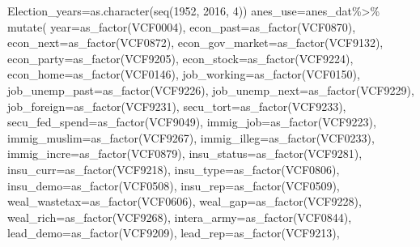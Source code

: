 \documentclass[
]{article}
\newenvironment{Shaded}{\begin{snugshade}}{\end{snugshade}}
\newcommand{\AttributeTok}[1]{\textcolor[rgb]{0.77,0.63,0.00}{#1}}
\newcommand{\DecValTok}[1]{\textcolor[rgb]{0.00,0.00,0.81}{#1}}
\newcommand{\FunctionTok}[1]{\textcolor[rgb]{0.00,0.00,0.00}{#1}}
\newcommand{\NormalTok}[1]{#1}
\newcommand{\OtherTok}[1]{\textcolor[rgb]{0.56,0.35,0.01}{#1}}
\newcommand{\SpecialCharTok}[1]{\textcolor[rgb]{0.00,0.00,0.00}{#1}}
\begin{document}
\begin{Shaded}
\begin{Highlighting}[]
\NormalTok{Election\_years}\OtherTok{=}\FunctionTok{as.character}\NormalTok{(}\FunctionTok{seq}\NormalTok{(}\DecValTok{1952}\NormalTok{, }\DecValTok{2016}\NormalTok{, }\DecValTok{4}\NormalTok{))}
\NormalTok{anes\_use}\OtherTok{=}\NormalTok{anes\_dat}\SpecialCharTok{\%\textgreater{}\%}
  \FunctionTok{mutate}\NormalTok{(}
    \AttributeTok{year=}\FunctionTok{as\_factor}\NormalTok{(VCF0004),}
    \AttributeTok{econ\_past=}\FunctionTok{as\_factor}\NormalTok{(VCF0870),}
    \AttributeTok{econ\_next=}\FunctionTok{as\_factor}\NormalTok{(VCF0872),}
    \AttributeTok{econ\_gov\_market=}\FunctionTok{as\_factor}\NormalTok{(VCF9132),}
    \AttributeTok{econ\_party=}\FunctionTok{as\_factor}\NormalTok{(VCF9205),}
    \AttributeTok{econ\_stock=}\FunctionTok{as\_factor}\NormalTok{(VCF9224),}
    \AttributeTok{econ\_home=}\FunctionTok{as\_factor}\NormalTok{(VCF0146),}
    \AttributeTok{job\_working=}\FunctionTok{as\_factor}\NormalTok{(VCF0150),}
    \AttributeTok{job\_unemp\_past=}\FunctionTok{as\_factor}\NormalTok{(VCF9226),}
    \AttributeTok{job\_unemp\_next=}\FunctionTok{as\_factor}\NormalTok{(VCF9229),}
    \AttributeTok{job\_foreign=}\FunctionTok{as\_factor}\NormalTok{(VCF9231),}
    \AttributeTok{secu\_tort=}\FunctionTok{as\_factor}\NormalTok{(VCF9233),}
    \AttributeTok{secu\_fed\_spend=}\FunctionTok{as\_factor}\NormalTok{(VCF9049),}
    \AttributeTok{immig\_job=}\FunctionTok{as\_factor}\NormalTok{(VCF9223),}
    \AttributeTok{immig\_muslim=}\FunctionTok{as\_factor}\NormalTok{(VCF9267),}
    \AttributeTok{immig\_illeg=}\FunctionTok{as\_factor}\NormalTok{(VCF0233),}
    \AttributeTok{immig\_incre=}\FunctionTok{as\_factor}\NormalTok{(VCF0879),}
    \AttributeTok{insu\_status=}\FunctionTok{as\_factor}\NormalTok{(VCF9281),}
    \AttributeTok{insu\_curr=}\FunctionTok{as\_factor}\NormalTok{(VCF9218),}
    \AttributeTok{insu\_type=}\FunctionTok{as\_factor}\NormalTok{(VCF0806),}
    \AttributeTok{insu\_demo=}\FunctionTok{as\_factor}\NormalTok{(VCF0508),}
    \AttributeTok{insu\_rep=}\FunctionTok{as\_factor}\NormalTok{(VCF0509),}
    \AttributeTok{weal\_wastetax=}\FunctionTok{as\_factor}\NormalTok{(VCF0606),}
    \AttributeTok{weal\_gap=}\FunctionTok{as\_factor}\NormalTok{(VCF9228),}
    \AttributeTok{weal\_rich=}\FunctionTok{as\_factor}\NormalTok{(VCF9268),}
    \AttributeTok{intera\_army=}\FunctionTok{as\_factor}\NormalTok{(VCF0844),}
    \AttributeTok{lead\_demo=}\FunctionTok{as\_factor}\NormalTok{(VCF9209),}
    \AttributeTok{lead\_rep=}\FunctionTok{as\_factor}\NormalTok{(VCF9213),}

\end{Highlighting}
\end{Shaded}
\end{document}
